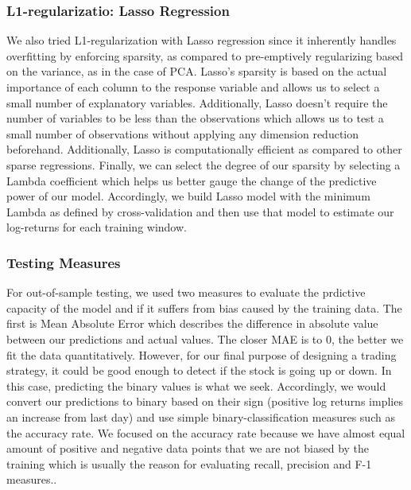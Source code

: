 \subsubsection{L1-regularizatio: Lasso Regression}
We also tried L1-regularization with Lasso regression since it inherently handles overfitting by enforcing sparsity, as compared to pre-emptively regularizing based on the variance, as in the case of PCA. \cite{glmnet} Lasso's sparsity is based on the actual importance of each column to the response variable and allows us to select a small number of explanatory variables. Additionally, Lasso doesn't require the number of variables to be less than the observations which allows us to test a small number of observations without applying any dimension reduction beforehand.
Additionally, Lasso is computationally efficient as compared to other sparse regressions.\cite{glmnet} Finally, we can select the degree of our sparsity by selecting a Lambda coefficient which helps us better gauge the change of the predictive power of our model.
Accordingly, we build Lasso model with the minimum Lambda as defined by cross-validation and then use that model to estimate our log-returns for each training window.
\subsubsection{Testing Measures}
For out-of-sample testing, we used two measures to evaluate the prdictive capacity of the model and if it suffers from bias caused by the training data. The first is Mean Absolute Error which describes the difference in absolute value between our predictions and actual values. The closer MAE is to 0, the better we fit the data quantitatively. However, for our final purpose of designing a trading strategy, it could be good enough to detect if the stock is going up or down. In this case, predicting the binary values is what we seek. Accordingly, we would convert our predictions to binary based on their sign (positive log returns implies an increase from last day) and use simple binary-classification measures such as the accuracy rate. We focused on the accuracy rate because we have almost equal amount of positive and negative data points that we are not biased by the training which is usually the reason for evaluating recall, precision and F-1 measures..
